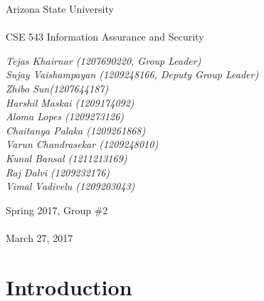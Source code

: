 \documentclass[11pt]{article}
\title{\fulltitle}
\date{}
\begin{document}
	\begingroup
		\fontsize{20pt}{20pt}\selectfont
		\begin{center}
			Arizona State University \\~\\
			CSE 543 Information Assurance and Security
		\end{center}
	\endgroup
	{\let\newpage\relax\maketitle}
	\begingroup
	\fontsize{15pt}{15pt}\selectfont
	\begin{center}
		\textit{Tejas Khairnar (1207690220, Group Leader) \\Sujay Vaishampayan (1209248166, Deputy Group Leader)\\  Zhibo Sun(1207644187)\\Harshil Maskai (1209174092)\\ Aloma Lopes (1209273126)\\ Chaitanya Palaka (1209261868)\\ Varun Chandrasekar (1209248010) \\ Kunal Bansal (1211213169) \\ Raj Dalvi (1209232176) \\ Vimal Vadivelu (1209203043)}
	\end{center}
	\endgroup
	\begin{abstract}
		\textbf{\textit{There are multitude of potentially malicious samples out there in the wild. The signatures for these malwares are mainly created manually. This creates a semantic gap while detecting known piece of malware and unknown pieces of malwares. This survey article provides an overview of various techniques used to perform malware analysis, detect and prevent them. It also covers various strategies to detect these malwares pro-actively and be one step ahead of the attackers.}}
	\end{abstract}
		\begingroup
		\fontsize{10pt}{10pt}\selectfont
			\begin{center}
				Spring 2017, Group \#2 \\~\\
				March 27, 2017
			\end{center}
		\endgroup


	\newpage
	\tableofcontents
	\newpage
	\listoftables
	\newpage
	\listoffigures
	\newpage
	\section{Introduction}
\end{document}
